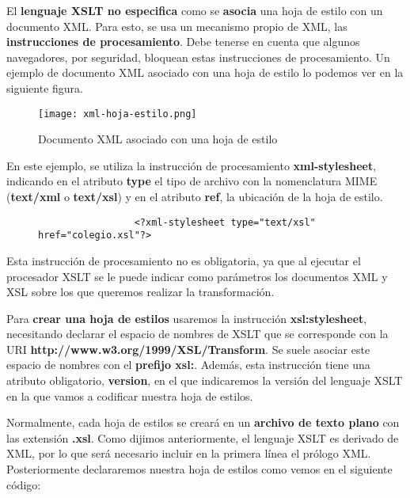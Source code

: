 El \textbf{lenguaje XSLT no especifica} como se \textbf{asocia} una hoja de estilo con un documento XML. Para esto, se usa un mecanismo propio de XML, las \textbf{instrucciones de procesamiento}. Debe tenerse en cuenta que algunos navegadores, por seguridad, bloquean estas instrucciones de procesamiento. Un ejemplo de documento XML asociado con una hoja de estilo lo podemos ver en la siguiente figura.

\begin{figure}[H]
    \centering
    \texttt{[image: xml-hoja-estilo.png]}
    \caption{Documento XML asociado con una hoja de estilo}
\end{figure}

En este ejemplo, se utiliza la instrucción de procesamiento \textbf{xml-stylesheet}, indicando en el atributo \textbf{type} el tipo de archivo con la nomenclatura MIME (\textbf{text/xml} o \textbf{text/xsl}) y en el atributo \textbf{ref}, la ubicación de la hoja de estilo.

\begin{figure}[h]
    \begin{tcolorbox}[sharp corners, colback=yellow!30, colframe=white!20]
        \scriptsize
\begin{verbatim}
                 <?xml-stylesheet type="text/xsl" href="colegio.xsl"?>
\end{verbatim}
    \end{tcolorbox}
\end{figure}

Esta instrucción de procesamiento no es obligatoria, ya que al ejecutar el procesador XSLT se le puede indicar	como parámetros los documentos XML y XSL sobre los que queremos realizar la transformación.

Para \textbf{crear una hoja de estilos} usaremos la instrucción \textbf{xsl:stylesheet}, necesitando declarar el espacio de nombres de XSLT que se corresponde con la URI \textbf{http://www.w3.org/1999/XSL/Transform}. Se suele asociar este espacio de nombres con el \textbf{prefijo xsl:}. Además, esta instrucción tiene una atributo obligatorio, \textbf{version}, en el que indicaremos la versión del lenguaje XSLT en la que vamos a codificar nuestra hoja de estilos.

Normalmente, cada hoja de estilos se creará en un \textbf{archivo de texto plano} con las extensión \textbf{.xsl}. Como dijimos anteriormente, el lenguaje XSLT es derivado de XML, por lo que será necesario incluir en la primera línea el prólogo XML. Posteriormente declararemos nuestra hoja de estilos como vemos en el siguiente código:

